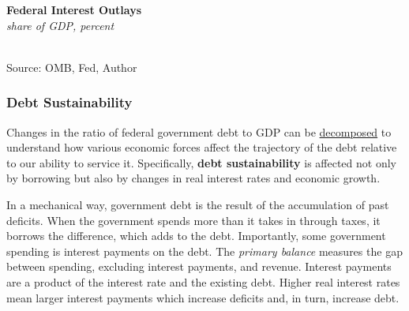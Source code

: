 \documentclass{report}
\makeatletter
\newcommand{\tbllink}[1]{\href{https://raw.githubusercontent.com/bdecon/US-chartbook/master/chartbook/data/#1}{\faTable}}
\newcommand*\short[1]{\expandafter\@gobbletwo\number\numexpr#1\relax}
\newcommand{\absnode}[3]{\node[below right, align=left] at (axis cs: #1,#2) {#3};}
\newcommand{\shdateaxisticks}{
		date coordinates in=x, axis line style={draw=none},
		xmax={2023-10-01},
		max space between ticks=40,	    
		xtick={{1990-01-01}, {1995-01-01}, {2000-01-01}, 
			{2005-01-01}, {2010-01-01}, {2015-01-01}, {2020-01-01}},
		minor xtick={},
		enlarge y limits={0.06}, enlarge x limits={0.01},
		}
\newcommand{\bbar}[2]{extra #1 ticks = {{#2}}, extra #1 tick labels = ,
		extra #1 tick style = {grid=major, grid style={thick, black!25}},}
\newcommand{\dashline}[4]{\addplot[very thick, dashed, no markers, color=#1] 
		table [x=#2, y=#3, col sep=comma] {#4};	}
\newcommand{\thickline}[4]{\addplot[ultra thick, no markers, color=#1] 
		table [x=#2, y=#3, col sep=comma] {#4};	}
\newcommand{\rbars}{
		\fill[color=black!10] (axis cs:{1990-07-01},\pgfkeysvalueof{/pgfplots/ymin}) rectangle 
			(axis cs:{1991-03-01}, \pgfkeysvalueof{/pgfplots/ymax});
		\fill[color=black!10] (axis cs:{2007-12-01},\pgfkeysvalueof{/pgfplots/ymin}) rectangle 
			(axis cs:{2009-07-01}, \pgfkeysvalueof{/pgfplots/ymax});
		\fill[color=black!10] (axis cs:{2001-03-01},\pgfkeysvalueof{/pgfplots/ymin}) rectangle 
			(axis cs:{2001-11-01}, \pgfkeysvalueof{/pgfplots/ymax});
		\fill[color=black!10] (axis cs:{2020-02-01},\pgfkeysvalueof{/pgfplots/ymin}) rectangle 
			(axis cs:{2020-05-01}, \pgfkeysvalueof{/pgfplots/ymax});}
\makeatother
\begin{document}
{\begin{minipage}{0.76\textwidth}
\begin{minipage}{0.46\textwidth}
\small 
\end{minipage} \hfill \begin{minipage}{0.48\textwidth}
\normalsize \textbf{Federal Interest Outlays}\\
\footnotesize{\textit{share of GDP, percent}}\\
\hspace*{-2mm} \\
\footnotesize{Source: OMB, Fed, Author} \hfill \tbllink{fedintexp.csv}
\end{minipage} 
\vspace{1mm}

\small 
\end{minipage}
\newpage
\begin{minipage}{0.76\textwidth}   
\subsubsection*{Debt Sustainability}
\small Changes in the ratio of federal government debt to GDP can be \href{https://www.imf.org/en/Publications/TNM/Issues/2016/12/31/A-Practical-Guide-to-Public-Debt-Dynamics-Fiscal-Sustainability-and-Cyclical-Adjustment-of-23498}{decomposed} to understand how various economic forces affect the trajectory of the debt relative to our ability to service it. Specifically, \textbf{debt sustainability} is affected not only by borrowing but also by changes in real interest rates and economic growth. 

In a mechanical way, government debt is the result of the accumulation of past deficits. When the government spends more than it takes in through taxes, it borrows the difference, which adds to the debt. Importantly, some government spending is interest payments on the debt. The \textit{primary balance} measures the gap between spending, excluding interest payments, and revenue. Interest payments are a product of the interest rate and the existing debt. Higher real interest rates mean larger interest payments which increase deficits and, in turn, increase debt.


\end{minipage}}
\end{document}
